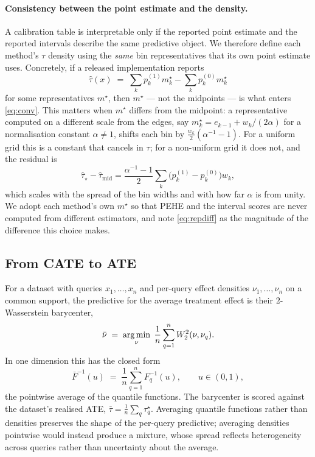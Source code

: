 \paragraph{Consistency between the point estimate and the density.}
A calibration table is interpretable only if the reported point estimate and
the reported intervals describe the same predictive object. We therefore
define each method's $\tau$ density using the \emph{same} bin representatives
that its own point estimate uses. Concretely, if a released implementation
reports
\begin{equation}
  \hat\tau(x) \;=\; \sum_k p^{(1)}_k m^{\star}_k - \sum_k p^{(0)}_k m^{\star}_k
\end{equation}
for some representatives $m^{\star}$, then $m^{\star}$ --- not the midpoints
--- is what enters \eqref{eq:conv}. This matters when $m^{\star}$ differs from
the midpoint: a representative computed on a different scale from the edges,
say $m^{\star}_k = e_{k-1} + w_k/(2\alpha)$ for a normalisation constant
$\alpha \neq 1$, shifts each bin by $\tfrac{w_k}{2}(\alpha^{-1}-1)$. For a
uniform grid this is a constant that cancels in $\tau$; for a non-uniform
grid it does not, and the residual is
\begin{equation}
  \hat\tau_{\star} - \hat\tau_{\mathrm{mid}}
  = \frac{\alpha^{-1}-1}{2} \sum_k \bigl(p^{(1)}_k - p^{(0)}_k\bigr) w_k ,
  \label{eq:repdiff}
\end{equation}
which scales with the spread of the bin widths and with how far $\alpha$ is
from unity. We adopt each method's own $m^{\star}$ so that PEHE and the
interval scores are never computed from different estimators, and note
\eqref{eq:repdiff} as the magnitude of the difference this choice makes.

\subsection{From CATE to ATE}
\label{app:ate}

For a dataset with queries $x_1,\dots,x_n$ and per-query effect densities
$\nu_1,\dots,\nu_n$ on a common support, the predictive for the average
treatment effect is their $2$-Wasserstein barycenter,
\begin{equation}
  \bar\nu \;=\; \operatorname*{arg\,min}_{\nu} \; \frac{1}{n}\sum_{q=1}^{n} W_2^2(\nu, \nu_q) .
\end{equation}
In one dimension this has the closed form
\begin{equation}
  \boxed{\;
  \bar F^{-1}(u) \;=\; \frac{1}{n}\sum_{q=1}^{n} F_q^{-1}(u),
  \qquad u \in (0,1),
  \;}
\end{equation}
the pointwise average of the quantile functions. The barycenter is scored
against the dataset's realised ATE, $\bar\tau = \tfrac{1}{n}\sum_q \tau^\star_q$.
Averaging quantile functions rather than densities preserves the shape of the
per-query predictive; averaging densities pointwise would instead produce a
mixture, whose spread reflects heterogeneity across queries rather than
uncertainty about the average.


